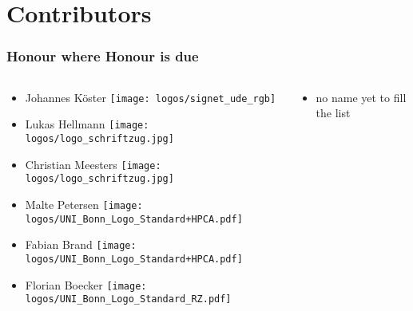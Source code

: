 \section{Contributors}

\begin{frame}
  \frametitle{Honour where Honour is due}
  \begin{columns}
  	\begin{column}{.5\textwidth}
  	   \begin{itemize}
  	   	\item Johannes Köster \texttt{[image: logos/signet\_ude\_rgb]}
  	   	\item Lukas Hellmann \texttt{[image: logos/logo\_schriftzug.jpg]}
  	   	\item Christian Meesters \texttt{[image: logos/logo\_schriftzug.jpg]}
  	   	\item Malte Petersen \texttt{[image: logos/UNI\_Bonn\_Logo\_Standard+HPCA.pdf]}
  	   	\item Fabian Brand \texttt{[image: logos/UNI\_Bonn\_Logo\_Standard+HPCA.pdf]}
  	   	\item Florian Boecker \texttt{[image: logos/UNI\_Bonn\_Logo\_Standard\_RZ.pdf]}
  	   \end{itemize}	
  	\end{column}
    \begin{column}{.5\textwidth}
    	\begin{itemize}
    		\item no name yet to fill the list
    	\end{itemize}	
    \end{column}
  \end{columns}
		
\end{frame}

